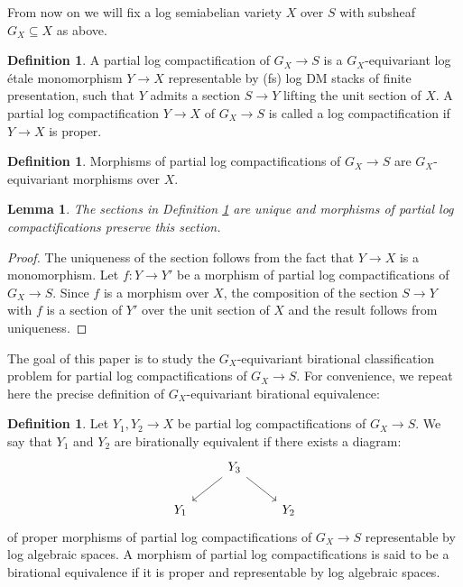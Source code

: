 \documentclass[11pt]{amsart}
\newtheorem{lemma}[theorem]{Lemma}
\theoremstyle{definition}
\newtheorem{definition}[theorem]{Definition}
\theoremstyle{remark}
\begin{document}
From now on we will fix a log semiabelian variety $X$ over $S$ with subsheaf $G_X\subseteq X$ as above.

\begin{definition}
	\label{def:log_cpt}
	A partial log compactification of $G_X\to S$ is a $G_X$-equivariant
	log étale monomorphism $Y\to X$ representable by (fs) log DM stacks
	of finite presentation, such that $Y$
	admits a section $S\to Y$ lifting the unit section of $X$. A partial log compactification $Y\to X$ of $G_X\to S$ is called a log compactification if $Y\to X$ is proper.
\end{definition}

\begin{definition}
	Morphisms of partial log compactifications of $G_X\to S$ are $G_X$-equivariant
	morphisms over $X$.
\end{definition}

\begin{lemma}
	\label{lem:morphs_commute_sec}
	The sections in Definition \ref{def:log_cpt} are unique
	and morphisms of partial log compactifications preserve this section.
\end{lemma}

\begin{proof}
	The uniqueness of the section follows from the fact that
	$Y\to X$ is a monomorphism.
	Let $f:Y\to Y'$ be a morphism of partial log compactifications of
	$G_X\to S$. Since $f$
	is a morphism over $X$, the composition of the section
	$S\to Y$ with $f$ is a section of $Y'$ over the unit section
	of $X$ and the result follows from uniqueness.
\end{proof}

The goal of this paper is to study the $G_X$-equivariant birational
classification problem for partial log compactifications of $G_X\to S$.
For convenience, we repeat here the precise definition of
$G_X$-equivariant birational equivalence:

\begin{definition}
	Let $Y_1,Y_2\to X$ be partial log compactifications of $G_X\to S$. We
	say that $Y_1$ and $Y_2$ are birationally equivalent if there exists a
	diagram:
	$$\begin{tikzcd}
		&Y_3\arrow[dr]\arrow[dl]&\\
		Y_1&&Y_2
	\end{tikzcd}$$
	of proper morphisms of partial log compactifications of $G_X\to S$
	representable by log algebraic spaces. A morphism of partial
	log compactifications is said to be a birational equivalence
	if it is proper and representable by log algebraic spaces.
\end{definition}
\end{document}
